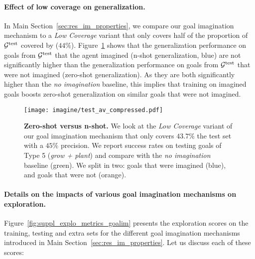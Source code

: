 \paragraph{Effect of low coverage on generalization.}
In Main Section~\ref{sec:res_im_properties}, we compare our goal imagination mechanism to a \textit{Low Coverage} variant that only covers half of the proportion of $\mathcal{G}^{\text{test}}$ covered by \CGH ($44\%$). Figure~\ref{fig:suppl_halftc} shows that the generalization performance on goals from $\mathcal{G}^{\text{test}}$ that the agent imagined (n-shot generalization, blue) are not significantly higher than the generalization performance on goals from $\mathcal{G}^{\text{test}}$ that were not imagined (zero-shot generalization). As they are both significantly higher than the \textit{no imagination} baseline, this implies that training on imagined goals boosts zero-shot generalization on similar goals that were not imagined. 


\begin{figure}[!h]
      \centering
      \texttt{[image: imagine/test\_av\_compressed.pdf]}
      \caption{\textbf{Zero-shot versus n-shot.} We look at the \textit{Low Coverage} variant of our goal imagination mechanism that only covers $43.7\%$ the test set with a $45\%$ precision. We report success rates on testing goals of Type 5 (\textit{grow + plant}) and compare with the \textit{no imagination} baseline (green). We split in two: goals that were imagined (blue), and goals that were not (orange). \label{fig:suppl_halftc}}
\end{figure} 

\clearpage
\paragraph{Details on the impacts of various goal imagination mechanisms on exploration.}
Figure~\ref{fig:suppl_explo_metrics_goalim} presents the \itwoc exploration scores on the training, testing and extra sets for the different goal imagination mechanisms introduced in Main Section~\ref{sec:res_im_properties}. Let us discuss each of these scores:

